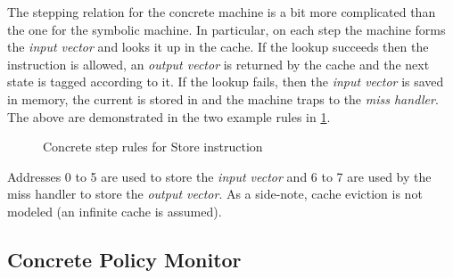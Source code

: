 The stepping relation for the concrete machine is a bit more complicated than
the one for the symbolic machine. In particular, on each step the machine forms
the \emph{input vector} and looks it up in the cache. If the lookup succeeds
then the instruction is allowed, an \emph{output vector} is returned by the
cache and the next state is tagged according to it.
If the lookup fails, then the \emph{input vector} is saved in memory, the
current \pc is stored in \epc and the machine traps to the \emph{miss handler}.
The above are demonstrated in the two example rules in \cref{cstep_store}.

\begin{figure}[htb]
\bigskip
{}
\caption{Concrete step rules for Store instruction}
\label{cstep_store}
\end{figure}

Addresses 0 to 5 are used to store the \emph{input vector} and 6 to 7 are used
by the miss handler to store the \emph{output vector}. As a side-note, cache
eviction is not modeled (an infinite cache is assumed).

\subsection{Concrete Policy Monitor}\label{sec:concrete_policy}

